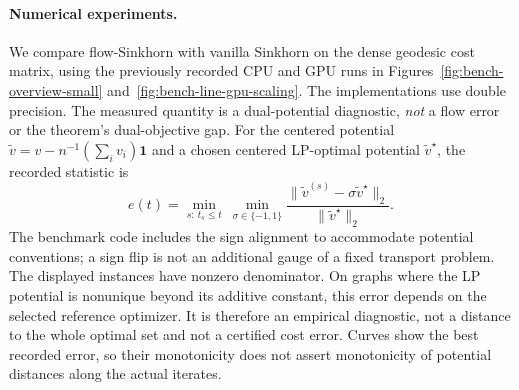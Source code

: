 \paragraph{Numerical experiments.}
We compare flow-Sinkhorn with vanilla Sinkhorn on the dense geodesic cost matrix, using the previously recorded CPU and GPU runs in Figures~\ref{fig:bench-overview-small} and~\ref{fig:bench-line-gpu-scaling}. The implementations use double precision. The measured quantity is a dual-potential diagnostic, \emph{not} a flow error or the theorem's dual-objective gap. For the centered potential $\widetilde v=v-n^{-1}(\sum_i v_i)\mathbf1$ and a chosen centered LP-optimal potential $\widetilde v^\star$, the recorded statistic is
\begin{equation}\label{eq:benchmark-error}
 e(t)=\min_{s:\ t_s\leq t}\ \min_{\sigma\in\{-1,1\}}
 \frac{\|\widetilde v^{(s)}-\sigma\widetilde v^\star\|_2}
 {\|\widetilde v^\star\|_2}.
\end{equation}
The benchmark code includes the sign alignment to accommodate potential conventions; a sign flip is not an additional gauge of a fixed transport problem. The displayed instances have nonzero denominator. On graphs where the LP potential is nonunique beyond its additive constant, this error depends on the selected reference optimizer. It is therefore an empirical diagnostic, not a distance to the whole optimal set and not a certified cost error. Curves show the best recorded error, so their monotonicity does not assert monotonicity of potential distances along the actual iterates.

